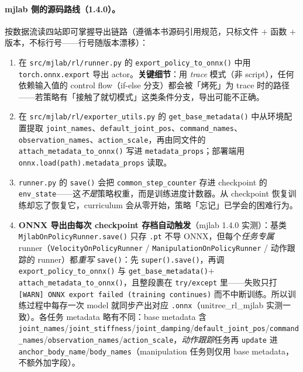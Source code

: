 \paragraph{mjlab 侧的源码路线（1.4.0）。}按数据流读四站即可掌握导出链路（遵循本书源码引用规范，只标文件 $+$ 函数 $+$ 版本，不标行号——行号随版本漂移）：
\begin{enumerate}
  \item 在 \texttt{src/mjlab/rl/runner.py} 的 \texttt{export\_policy\_to\_onnx()} 中用 \verb|torch.onnx.export| 导出 actor。\textbf{关键细节}：用 \emph{trace} 模式（非 script），任何依赖输入值的 control flow（if-else 分支）都会被「烤死」为 trace 时的路径——若策略有「接触了就切模式」这类条件分支，导出可能不正确。
  \item 在 \texttt{src/mjlab/rl/exporter\_utils.py} 的 \texttt{get\_base\_metadata()} 中从环境配置提取 \verb|joint_names|、\verb|default_joint_pos|、\verb|command_names|、\verb|observation_names|、\verb|action_scale|，再由同文件的 \texttt{attach\_metadata\_to\_onnx()} 写进 \verb|metadata_props|；部署端用 \verb|onnx.load(path).metadata_props| 读取。
  \item \texttt{runner.py} 的 \texttt{save()} 会把 \verb|common_step_counter| 存进 checkpoint 的 \verb|env_state|——这\emph{不是}策略权重，而是训练进度计数器。从 checkpoint 恢复训练却忘了恢复它，curriculum 会从零开始，策略「忘记」已学会的困难行为。
  \item \textbf{ONNX 导出由每次 checkpoint 存档自动触发}（mjlab 1.4.0 实测）：基类 \texttt{MjlabOnPolicyRunner.save()} 只存 \verb|.pt| 不导 ONNX，但每个\emph{任务专属} runner（\texttt{VelocityOnPolicyRunner} / \texttt{ManipulationOnPolicyRunner} / 动作跟踪的 runner）都\emph{重写} \texttt{save()}：先 \texttt{super().save()}，再调 \texttt{export\_policy\_to\_onnx()} 与 \texttt{get\_base\_metadata()}$+$\texttt{attach\_metadata\_to\_onnx()}，且整段裹在 \verb|try/except| 里——失败只打 \verb|[WARN] ONNX export failed (training continues)| 而不中断训练。所以训练过程中每存一次 model 就同步产出对应 \verb|.onnx|（unitree\_rl\_mjlab 实测一致）。各任务 metadata 略有不同：base metadata 含 \verb|joint_names|/\verb|joint_stiffness|/\verb|joint_damping|/\verb|default_joint_pos|/\verb|command_names|/\verb|observation_names|/\verb|action_scale|，\emph{动作跟踪}任务再 \texttt{update} 进 \verb|anchor_body_name|/\verb|body_names|（manipulation 任务则仅用 base metadata，不额外加字段）。
\end{enumerate}

